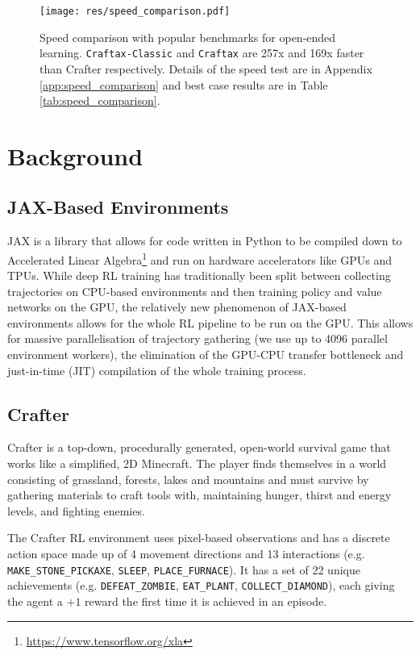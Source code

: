 \documentclass{article}
\theoremstyle{plain}
\theoremstyle{definition}
\theoremstyle{remark}
\begin{document}
\begin{figure}[!ht]
    \centering
    \texttt{[image: res/speed\_comparison.pdf]}
    \caption{Speed comparison with popular benchmarks for open-ended learning.  \texttt{Craftax-Classic} and \texttt{Craftax} are 257x and 169x faster than Crafter respectively. Details of the speed test are in Appendix \ref{app:speed_comparison} and best case results are in Table \ref{tab:speed_comparison}.}
    \label{fig:speed_comparison}
\end{figure}

\section{Background} \label{sec:background}

\subsection{JAX-Based Environments}\label{sec:background_jax}
JAX \citep{jax2018github} is a library that allows for code written in Python to be compiled down to Accelerated Linear Algebra\footnote{\url{https://www.tensorflow.org/xla}} and run on hardware accelerators like GPUs and TPUs.  While deep RL training has traditionally been split between collecting trajectories on CPU-based environments and then training policy and value networks on the GPU, the relatively new phenomenon of JAX-based environments allows for the whole RL pipeline to be run on the GPU.  This allows for massive parallelisation of trajectory gathering (we use up to 4096 parallel environment workers), the elimination of the GPU-CPU transfer bottleneck and just-in-time (JIT) compilation of the whole training process.

\subsection{Crafter} \label{sec:background_crafter}

Crafter \citep{hafner2021benchmarking} is a top-down, procedurally generated, open-world survival game that works like a simplified, 2D Minecraft.  The player finds themselves in a world consisting of grassland, forests, lakes and mountains and must survive by gathering materials to craft tools with, maintaining hunger, thirst and energy levels, and fighting enemies.

The Crafter RL environment uses pixel-based observations and has a discrete action space made up of 4 movement directions and 13 interactions (e.g. \texttt{MAKE\_STONE\_PICKAXE}, \texttt{SLEEP}, \texttt{PLACE\_FURNACE}).  It has a set of 22 unique achievements (e.g. \texttt{DEFEAT\_ZOMBIE}, \texttt{EAT\_PLANT}, \texttt{COLLECT\_DIAMOND}), each giving the agent a $+1$ reward the first time it is achieved in an episode.
\end{document}
